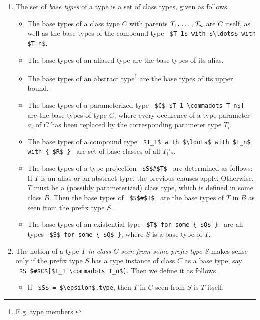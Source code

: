 \begin{enumerate}

\item
The set of {\em base types} of a type is a set of class types, given as follows.
\begin{itemize}
\item The base types of a class type $C$ with parents $T_1 ,\, \ldots ,\, T_n$ are $C$ itself, as well as the base types of the compound type ~\lstinline!$T_1$ with $\ldots$ with $T_n$!. 

\item The base types of an aliased type are the base types of its alias. 

\item The base types of an abstract type\footnote{E.g. type members.} are the base types of its upper bound. 

\item The base types of a parameterized type ~\lstinline!$C$[$T_1 \commadots T_n$]!~ are the base types of type $C$, where every occurence of a type parameter $a_i$ of $C$ has been replaced by the corresponding parameter type $T_i$. 

\item The base types of a compound type ~\lstinline!$T_1$ with $\ldots$ with $T_n$ with { $R$ }!~ are set of base classes of all $T_i$'s. 

\item The base types of a type projection ~\lstinline!$S$#$T$!~ are determined as follows: If $T$ is an alias or an abstract type, the previous clauses apply. Otherwise, $T$ must be a (possibly parameterized) class type, which is defined in some class $B$. Then the base types of ~\lstinline!$S$#$T$!~ are the base types of $T$ in $B$ as seen from the prefix type $S$. 

\item The base types of an existential type ~\lstinline!$T$ for-some { $Q$ }!~ are all types ~\lstinline!$S$ for-some { $Q$ }!, where $S$ is a base type of $T$. 
\end{itemize}

\item
The notion of a type {\em $T$ in class $C$ seen from some prefix type $S$} makes sense only if the prefix type $S$ has a type instance of class $C$ as a base type, say ~\lstinline!$S'$#$C$[$T_1 \commadots T_n$]!. Then we define it as follows.
\begin{itemize}
\item If ~\lstinline!$S$ = $\epsilon$.type!, then $T$ in $C$ seen from $S$ is $T$ itself. 


\end{itemize}
\end{enumerate}
